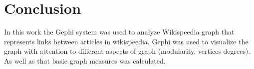 \section*{Conclusion}

In this work the Gephi system was used to analyze Wikispeedia graph that represents links between articles in wikispeedia.
Gephi was used to visualize the graph with attention to different aspects of graph (modularity, vertices degrees). As well as that basic graph measures was calculated.